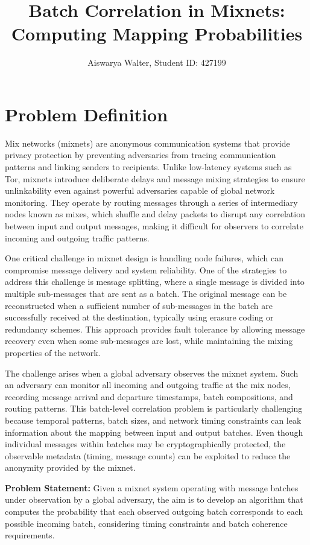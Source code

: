 \documentclass{article}
\title{Batch Correlation in Mixnets: Computing Mapping Probabilities}
\author{Aiswarya Walter, Student ID: 427199}
\date{}
\begin{document}
\maketitle

\section{Problem Definition}
\label{sec:problem}

Mix networks (mixnets) are anonymous communication systems that 
provide privacy protection by preventing 
adversaries from tracing communication patterns and 
linking senders to recipients. Unlike low-latency 
systems such as Tor, mixnets introduce deliberate 
delays and message mixing strategies to ensure 
 unlinkability even against powerful 
adversaries capable of global network monitoring. 
They operate by routing messages through a series 
of intermediary nodes known as mixes, which 
shuffle and delay packets to disrupt any 
correlation between input and output messages, 
making it difficult for observers to correlate 
incoming and outgoing traffic patterns.

One critical challenge in mixnet design is handling node failures, which 
can compromise message delivery and system reliability. One of the strategies 
to address this challenge is message splitting, where a single  
message is divided into multiple sub-messages that are sent as a batch. 
The original message can be reconstructed when a sufficient number of 
sub-messages in the batch are successfully received at the destination, 
typically using erasure coding or redundancy schemes. This approach 
provides fault tolerance by allowing message recovery even when some 
sub-messages are lost, while maintaining the mixing properties of 
the network.

The challenge arises when a global adversary observes 
the mixnet system. Such an adversary can monitor all incoming and outgoing 
traffic at the mix nodes, recording message arrival and departure timestamps, 
batch compositions, and routing patterns. This batch-level 
correlation problem is particularly challenging because 
temporal patterns, batch sizes, and network timing constraints can leak 
information about the mapping between input and output batches. Even 
though individual messages within batches may be cryptographically 
protected, the observable metadata (timing, message counts) 
can be exploited to reduce the anonymity provided by the mixnet.

\textbf{Problem Statement:} Given a mixnet system operating with
message batches under observation by a global adversary, the aim is to develop 
an algorithm that computes the probability 
that each observed outgoing batch corresponds to each possible incoming 
batch, considering timing constraints and batch coherence requirements.
\end{document}

